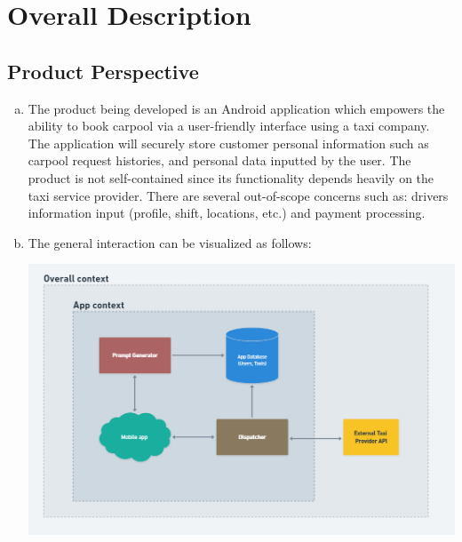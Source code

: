 \documentclass[]{article}
\begin{document}

\section{Overall Description}
\label{sec:overall_description}


\subsection{Product Perspective}
\label{sub:product_perspective}

\begin{enumerate}[a)]
	\item The product being developed is an Android application which empowers the ability to book carpool via a user-friendly interface using a taxi company. The application will securely store customer personal information such as carpool request histories, and personal data inputted by the user. The product is not self-contained since its functionality depends heavily on the taxi service provider. There are several out-of-scope concerns such as: driver\textquotesingle s information input (profile, shift, locations, etc.) and payment processing.
	\item The general interaction can be visualized as follows: 
	\begin{center}
		\includegraphics[scale=0.5]{app-context.png}
	\end{center}
\end{enumerate}

\end{document}
